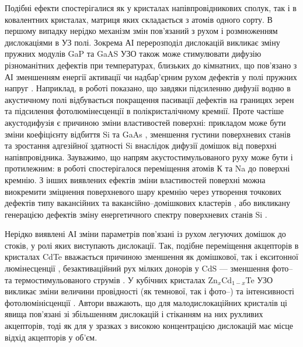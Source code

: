 Подібні ефекти спостерігалися як у кристалах напівпровідникових сполук, так і в ковалентних кристалах, матриця яких складається з атомів одного сорту.
В першому випадку нерідко механізм змін пов'язаний з рухом і розмноженням дислокаціями в УЗ полі.
Зокрема АІ перерозподіл дислокацій викликає зміну пружних модулів GaP та GaAS \cite{UST:GaP}
УЗО також може стимулювати дифузію різноманітних дефектів при температурах, близьких до кімнатних, що пов'язано
з АІ зменшенням  енергії активації чи надбар'єрним рухом дефектів у полі пружних напруг \cite{USdif:FTT90}.
Наприклад, в роботі \cite{Ostapenko1999} показано, що завдяки підсиленню дифузії водню в акустичному полі відбувається покращення пасивації дефектів на границях зерен \cite{Ostapenko1999} та підсилення фотолюмінесценції \cite{Ostap:PhotoLum,ostapenko1997} в полікристалічному кремнії.
Проте частіше акустодифузія є причиною зміни властивостей поверхні:
прикладом може бути зміни коефіцієнту відбиття Si та GaAs \cite{Zaver}, зменшення густини  поверхневих станів \cite{Zaver:2008r} та зростання адгезійної здатності \cite{Zaver96} Si внаслідок дифузії домішок від поверхні напівпровідника.
Зауважимо, що напрям акустостимульованого руху може бути і протилежним:
в роботі \cite{Ostrov2002FTPr} спостерігалося переміщення атомів К та Na до поверхні кремнію.
З інших виявлених ефектів зміни властивостей поверхні можна виокремити зміцнення поверхневого шару кремнію через утворення точкових дефектів типу вакансійних та вакансійно--домішкових кластерів \cite{Ostrov2000FTPr},
 або викликану генерацією дефектів зміну енергетичного спектру поверхневих станів Si \cite{Zaver:2008r}.

Нерідко виявлені АІ зміни параметрів пов'язані із рухом легуючих домішок до стоків, у ролі яких виступають дислокації.
Так, подібне переміщення акцепторів в кристалах CdTe вважається причиною зменшення як домішкової, так і екситонної люмінесценції \cite{US:CdTe},
безактиваційний рух мілких донорів у CdS --- зменшення фото-- та термостимульованого струмів \cite{BorkovFTT,sheinkman1995,BORKOVSKA2003}.
У кубічних кристалах Zn$_x$Cd$_{1-x}$Te  УЗО викликає зміни величини провідності (як темнової, так і фото--) та інтенсивності фотолюмінісценції \cite{US:ZnCdTe}.
Автори вважають, що для малодислокаційних кристалів ці явища пов'язані зі збільшенням дислокацій і стіканням на них рухливих акцепторів, тоді як для у зразках з високою концентрацією дислокацій має місце відхід акцепторів у об'єм.

